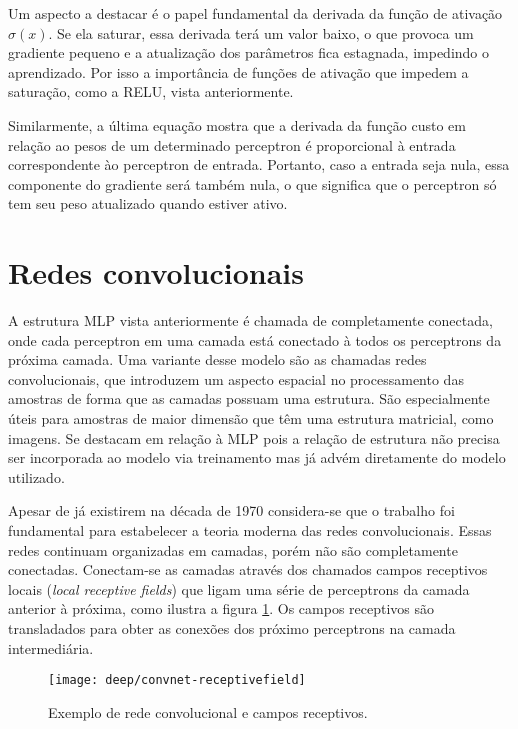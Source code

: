 Um aspecto a destacar é o papel fundamental da derivada da função de ativação $\sigma(x)$. Se ela saturar, essa derivada terá um valor baixo, o que provoca um gradiente pequeno e a atualização dos parâmetros fica estagnada, impedindo o aprendizado. Por isso a importância de funções de ativação que impedem a saturação, como a RELU, vista anteriormente.

Similarmente, a última equação mostra que a derivada da função custo em relação ao pesos de um determinado perceptron é proporcional à entrada correspondente ào perceptron de entrada. Portanto, caso a entrada seja nula, essa componente do gradiente será também nula, o que significa que o perceptron só tem seu peso atualizado quando estiver ativo.

\section{Redes convolucionais}

A estrutura MLP vista anteriormente é chamada de completamente conectada, onde cada perceptron em uma camada está conectado à todos os perceptrons da próxima camada. Uma variante desse modelo são as chamadas redes convolucionais, que introduzem um aspecto espacial no processamento das amostras de forma que as camadas possuam uma estrutura. São especialmente úteis para amostras de maior dimensão que têm uma estrutura matricial, como imagens. Se destacam em relação à MLP pois a relação de estrutura não precisa ser incorporada ao modelo via treinamento mas já advém diretamente do modelo utilizado.

Apesar de já existirem na década de 1970 considera-se que o trabalho \cite{lecun1998convnet} foi fundamental para estabelecer a teoria moderna das redes convolucionais. Essas redes continuam organizadas em camadas, porém não são completamente conectadas. Conectam-se as camadas através dos chamados campos receptivos locais (\textit{local receptive fields}) que ligam uma série de perceptrons da camada anterior à próxima, como ilustra a figura \ref{fig:convnet-receptivefield}. Os campos receptivos são transladados para obter as conexões dos próximo perceptrons na camada intermediária.

\begin{figure}[h]
\centering
\texttt{[image: deep/convnet-receptivefield]}
\caption{Exemplo de rede convolucional e campos receptivos.}
\label{fig:convnet-receptivefield}
\end{figure}

